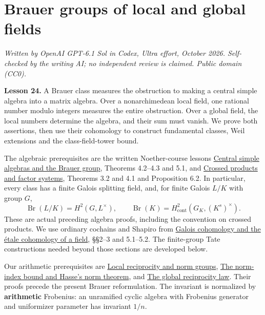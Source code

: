 \documentclass[11pt,a4paper]{article}
\begin{document}
\section{Brauer groups of local and global
fields}\label{brauer-groups-of-local-and-global-fields}

\emph{Written by OpenAI GPT-6.1 Sol in Codex, Ultra effort, October
2026. Self-checked by the writing AI; no independent review is claimed.
Public domain (CC0).}

\textbf{Lesson 24.} A Brauer class measures the obstruction to making a
central simple algebra into a matrix algebra. Over a nonarchimedean
local field, one rational number modulo integers measures the entire
obstruction. Over a global field, the local numbers determine the
algebra, and their sum must vanish. We prove both assertions, then use
their cohomology to construct fundamental classes, Weil extensions and
the class-field-tower bound.

The algebraic prerequisites are the written Noether-course lessons
\href{https://kokunoyumeto.github.io/open-math-courses/courses/AG-LTF/support/NOE-HYP--NOE-HYP-04.html\#4-maximal-subfields-and-splitting-fields}{Central
simple algebras and the Brauer group}, Theorems 4.2--4.3 and 5.1, and
\href{https://kokunoyumeto.github.io/open-math-courses/courses/AG-LTF/support/NOE-HYP--NOE-HYP-05.html\#3-multiplication-in-the-relative-brauer-group}{Crossed
products and factor systems}, Theorems 3.2 and 4.1 and Proposition 6.2.
In particular, every class has a finite Galois splitting field, and, for
finite Galois \(L/K\) with group \(G\), \[
\operatorname{Br}(L/K)=H^2(G,L^\times),\qquad
\operatorname{Br}(K)=H^2_{\mathrm{cont}}(G_K,(K^s)^\times).
\tag{1}
\] These are actual preceding algebra proofs, including the convention
on crossed products. We use ordinary cochains and Shapiro from
\href{https://kokunoyumeto.github.io/open-math-courses/courses/ag-etale-cohomology/galois-cohomology-and-the-etale-cohomology-of-a-field.html}{Galois
cohomology and the étale cohomology of a field}, §§2--3 and 5.1--5.2.
The finite-group Tate constructions needed beyond those sections are
developed below.

Our arithmetic prerequisites are
\href{../local-reciprocity-and-norm-groups.html}{Local reciprocity and
norm groups},
\href{../the-norm-index-bound-and-hasses-norm-theorem.html}{The
norm-index bound and Hasse's norm theorem}, and
\href{../the-global-reciprocity-law.html}{The global reciprocity law}.
Their proofs precede the present Brauer reformulation. The invariant is
normalized by \textbf{arithmetic} Frobenius: an unramified cyclic
algebra with Frobenius generator and uniformizer parameter has invariant
\(1/n\).
\end{document}
